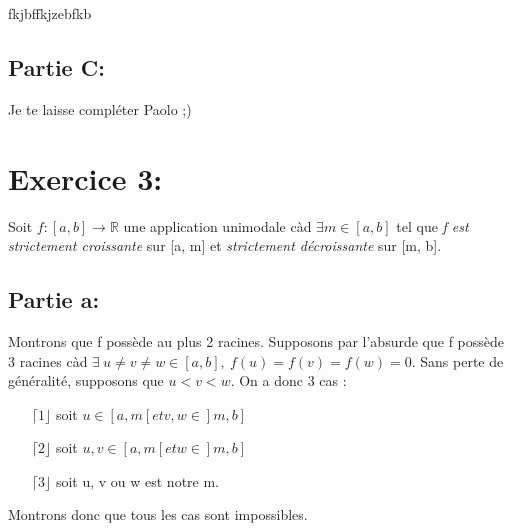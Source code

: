 fkjbffkjzebfkb\documentclass[a4paper, 12pt]{article}
\begin{document}
\newpage
\subsection{Partie C:}
Je te laisse compléter Paolo ;)


\newpage
\section{Exercice 3:}
Soit \( f : [a, b] \rightarrow \mathbb{R} \) une application unimodale càd \( \exists m \in [a, b] \) tel que \emph{f est strictement croissante} sur [a, m] et \emph{strictement décroissante} sur [m, b].
\subsection{Partie a:}
Montrons que f possède au plus 2 racines. \newline \newline
Supposons par l'absurde que f possède 3 racines càd \newline 
\( \exists ~ u \neq v \neq w \in [a, b], ~ f(u) = f(v) = f(w) = 0 \). \newline
Sans perte de généralité, supposons que \( u < v < w \). \newline
On a donc 3 cas :
\begin{enumerate}
	\item[\(\lceil 1 \rfloor\)] soit \( u \in [a, m[ et v, w \in ]m, b] \)
	\item[\(\lceil 2 \rfloor\)] soit \( u, v \in [a, m[ et w \in ]m, b] \)
	\item[\(\lceil 3 \rfloor\)] soit u, v ou w est notre m.
\end{enumerate}
Montrons donc que tous les cas sont impossibles.
\end{document}
